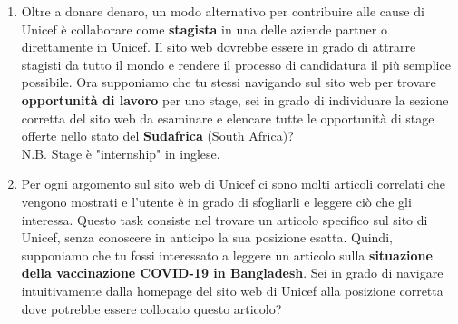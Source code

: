 \documentclass[11pt]{article}
\begin{document}
\begin{Form}
\begin{enumerate}
			\item Oltre a donare denaro, un modo alternativo per contribuire alle cause di Unicef è collaborare come \textbf{stagista} in una delle aziende partner o direttamente in Unicef. Il sito web dovrebbe essere in grado di attrarre stagisti da tutto il mondo e rendere il processo di candidatura il più semplice possibile. Ora supponiamo che tu stessi navigando sul sito web per trovare \textbf{opportunità di lavoro} per uno stage, sei in grado di individuare la sezione corretta del sito web da esaminare e elencare tutte le opportunità di stage offerte nello stato del \textbf{Sudafrica} (South Africa)?\\
			N.B. Stage è "internship" in inglese.
			
			\item Per ogni argomento sul sito web di Unicef ci sono molti articoli correlati che vengono mostrati e l'utente è in grado di sfogliarli e leggere ciò che gli interessa. Questo task consiste nel trovare un articolo specifico sul sito di Unicef, senza conoscere in anticipo la sua posizione esatta. Quindi, supponiamo che tu fossi interessato a leggere un articolo sulla \textbf{situazione della vaccinazione COVID-19 in Bangladesh}. Sei in grado di navigare intuitivamente dalla homepage del sito web di Unicef alla posizione corretta dove potrebbe essere collocato questo articolo?
			
			
		\end{enumerate}
		
		
		
	\end{Form}
	
	
	
\end{document}
